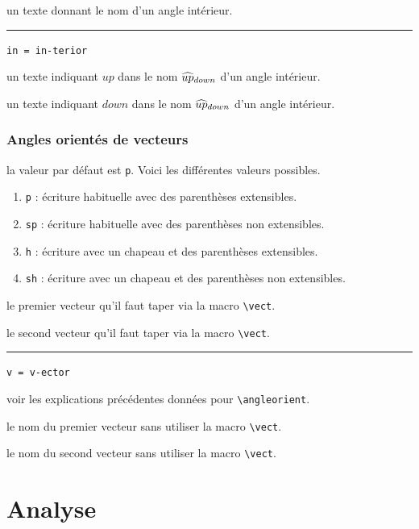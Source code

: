 \documentclass[12pt,a4paper]{book}
\newcommand\env[1]{\texttt{#1}}
\newcommand\macro[1]{\env{\textbackslash{}#1}}
\theoremstyle{definition}
\newcommand\separation{
	\medskip
	\hfill\rule{0.5\textwidth}{0.75pt}\hfill
	\medskip
}
\newcommand\mwhyprefix[2]{%
	\texttt{#1 = #1-#2}%
}
\begin{document}
{{\IDarg{} un texte donnant le nom d'un angle intérieur.


\separation


 \hfill \mwhyprefix{in}{terior}

 un texte indiquant $up$ dans le nom $\anglein*{up}{down}$ d'un angle intérieur.

 un texte indiquant $down$ dans le nom $\anglein*{up}{down}$ d'un angle intérieur.


\subsubsection{Angles orientés de vecteurs}




\IDoption{} la valeur par défaut est \verb+p+.  Voici les différentes valeurs possibles.
\begin{enumerate}
	\item \verb+p+ : écriture habituelle avec des parenthèses extensibles.

	\item \verb+sp+ : écriture habituelle avec des parenthèses non extensibles.

	\item \verb+h+ : écriture avec un chapeau et des parenthèses extensibles.

	\item \verb+sh+ : écriture avec un chapeau et des parenthèses non extensibles.
\end{enumerate}

 le premier vecteur qu'il faut taper via la macro \macro{vect}.

 le second vecteur qu'il faut taper via la macro \macro{vect}.


\separation


 \hfill \mwhyprefix{v}{ector}

\IDoption{} voir les explications précédentes données pour \macro{angleorient}.

 le nom du premier vecteur sans utiliser la macro \macro{vect}.

 le nom du second vecteur sans utiliser la macro \macro{vect}.


\section{Analyse}

}}
\end{document}
